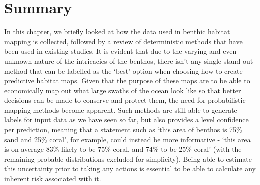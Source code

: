 \section{Summary}
In this chapter, we briefly looked at how the data used in benthic habitat mapping is collected, followed by a review of deterministic methods that have been used in existing studies. It is evident that due to the varying and even unknown nature of the intricacies of the benthos, there isn't any single stand-out method that can be labelled as the `best' option when choosing how to create predictive habitat maps. Given that the purpose of these maps are to be able to economically map out what large swaths of the ocean look like so that better decisions can be made to conserve and protect them, the need for probabilistic mapping methods become apparent. Such methods are still able to generate labels for input data as we have seen so far, but also provides a level confidence per prediction, meaning that a statement such as `this area of benthos is 75\% sand and 25\% coral', for example, could instead be more informative - `this area is on average 83\% likely to be 75\% coral, and 74\% to be 25\% coral' (with the remaining probable distributions excluded for simplicity). Being able to estimate this uncertainty prior to taking any actions is essential to be able to calculate any inherent risk associated with it.

